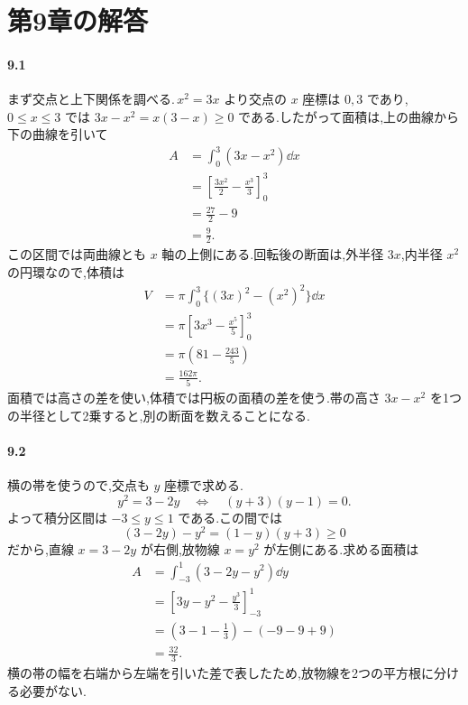 \section{第9章の解答}\label{解答:第9章}

\paragraph{9.1}
まず交点と上下関係を調べる.\,$x^2=3x$ より交点の $x$ 座標は $0,3$ であり,\,$0\le x\le3$ では $3x-x^2=x(3-x)\ge0$ である.したがって面積は,上の曲線から下の曲線を引いて
\[
\begin{aligned}
A&=\int_0^3(3x-x^2)\dd x\\
 &=\left[\frac{3x^2}{2}-\frac{x^3}{3}\right]_0^3\\
 &=\frac{27}{2}-9\\
 &=\frac92.
\end{aligned}
\]
この区間では両曲線とも $x$ 軸の上側にある.回転後の断面は,外半径 $3x$,内半径 $x^2$ の円環なので,体積は
\[
\begin{aligned}
V&=\pi\int_0^3\{(3x)^2-(x^2)^2\}\dd x\\
 &=\pi\left[3x^3-\frac{x^5}{5}\right]_0^3\\
 &=\pi\left(81-\frac{243}{5}\right)\\
 &=\frac{162\pi}{5}.
\end{aligned}
\]
面積では高さの差を使い,体積では円板の面積の差を使う.帯の高さ $3x-x^2$ を1つの半径として2乗すると,別の断面を数えることになる.

\paragraph{9.2}
横の帯を使うので,交点も $y$ 座標で求める.
\[
y^2=3-2y
\quad\Longleftrightarrow\quad
(y+3)(y-1)=0.
\]
よって積分区間は $-3\le y\le1$ である.この間では
\[
(3-2y)-y^2=(1-y)(y+3)\ge0
\]
だから,直線 $x=3-2y$ が右側,放物線 $x=y^2$ が左側にある.求める面積は
\[
\begin{aligned}
A&=\int_{-3}^1(3-2y-y^2)\dd y\\
 &=\left[3y-y^2-\frac{y^3}{3}\right]_{-3}^1\\
 &=\left(3-1-\frac13\right)-(-9-9+9)\\
 &=\frac{32}{3}.
\end{aligned}
\]
横の帯の幅を右端から左端を引いた差で表したため,放物線を2つの平方根に分ける必要がない.

